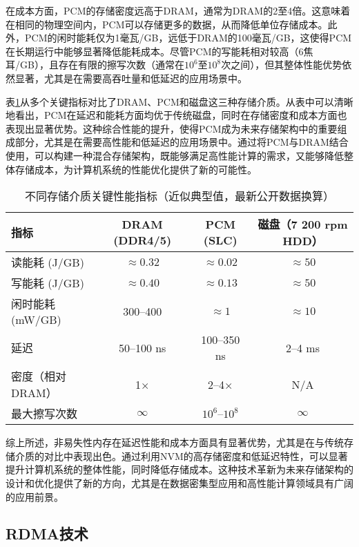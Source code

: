 在成本方面，PCM的存储密度远高于DRAM，通常为DRAM的2至4倍。这意味着在相同的物理空间内，PCM可以存储更多的数据，从而降低单位存储成本。此外，PCM的闲时能耗仅为1毫瓦/GB，远低于DRAM的100毫瓦/GB，这使得PCM在长期运行中能够显著降低能耗成本。尽管PCM的写能耗相对较高（6焦耳/GB），且存在有限的擦写次数（通常在$10^6$至$10^8$次之间），但其整体性能优势依然显著，尤其是在需要高吞吐量和低延迟的应用场景中。

表\ref{tab:storage_comparison}从多个关键指标对比了DRAM、PCM和磁盘这三种存储介质。从表中可以清晰地看出，PCM在延迟和能耗方面均优于传统磁盘，同时在存储密度和成本方面也表现出显著优势。这种综合性能的提升，使得PCM成为未来存储架构中的重要组成部分，尤其是在需要高性能和低延迟的应用场景中。通过将PCM与DRAM结合使用，可以构建一种混合存储架构，既能够满足高性能计算的需求，又能够降低整体存储成本，为计算机系统的性能优化提供了新的可能性。

\begin{table}[htb]
    \centering
    \caption{不同存储介质关键性能指标（近似典型值，最新公开数据换算）}
    \label{tab:storage_comparison}
    \begin{tabular}{lccc}
        \toprule
        指标 & DRAM (DDR4/5) & PCM (SLC) & 磁盘（7 200 rpm HDD）\\
        \midrule
        读能耗 (J/GB) & $\approx0.32$ & $\approx0.02$ & $\approx50$ \\
        写能耗 (J/GB) & $\approx0.40$ & $\approx0.13$ & $\approx50$ \\
        闲时能耗 (mW/GB) & 300–400 & $\approx1$ & $\approx10$ \\
        延迟 & 50–100 ns & 100–350 ns & 2–4 ms \\
        密度（相对 DRAM） & 1× & 2–4× & N/A \\
        最大擦写次数 & $\infty$ & $10^{6}$–$10^{8}$ & $\infty$ \\
        \bottomrule
    \end{tabular}
\end{table}

综上所述，非易失性内存在延迟性能和成本方面具有显著优势，尤其是在与传统存储介质的对比中表现出色。通过利用NVM的高存储密度和低延迟特性，可以显著提升计算机系统的整体性能，同时降低存储成本。这种技术革新为未来存储架构的设计和优化提供了新的方向，尤其是在数据密集型应用和高性能计算领域具有广阔的应用前景。

\subsection{RDMA技术}

